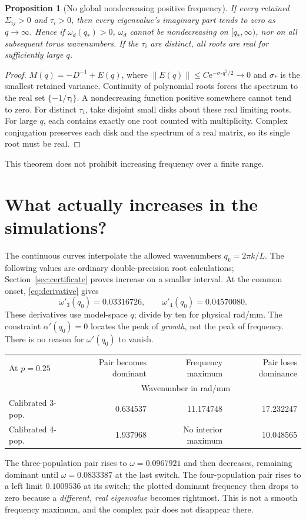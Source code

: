 \documentclass[11pt]{article}
\newtheorem{proposition}{Proposition}
\newcommand{\ee}{\mathrm e}
\begin{document}
\begin{proposition}[No global nondecreasing positive frequency]
If every retained $\Sigma_{ij}>0$ and $\tau_i>0$, then every eigenvalue's
imaginary part tends to zero as $q\to\infty$. Hence if $\omega_d(q_*)>0$,
$\omega_d$ cannot be nondecreasing on $[q_*,\infty)$, nor on all subsequent
torus wavenumbers. If the $\tau_i$ are distinct, all roots are real for
sufficiently large $q$.
\end{proposition}
\begin{proof}
$M(q)=-D^{-1}+E(q)$, where $\|E(q)\|\le C\ee^{-\sigma_*q^2/2}\to0$ and
$\sigma_*$ is the smallest retained variance. Continuity of polynomial roots
forces the spectrum to the real set $\{-1/\tau_i\}$. A nondecreasing function
positive somewhere cannot tend to zero. For distinct $\tau_i$, take disjoint
small disks about these real limiting roots. For large $q$, each contains
exactly one root counted with multiplicity. Complex conjugation preserves each
disk and the spectrum of a real matrix, so its single root must be real.
\end{proof}
This theorem does not prohibit increasing frequency over a finite range.

\newpage
\section{What actually increases in the simulations?}
The continuous curves interpolate the allowed wavenumbers $q_k=2\pi k/L$.
The following values are ordinary double-precision root calculations;
Section~\ref{sec:certificate} proves increase on a smaller interval.
At the common onset, \eqref{eq:derivative} gives
\begin{equation}
 \omega'_3(q_0)=0.03316726,\qquad
 \omega'_4(q_0)=0.04570080.
 \label{eq:slopes}
\end{equation}
These derivatives use model-space $q$; divide by ten for physical rad/mm.
The constraint $\alpha'(q_0)=0$ locates the peak of \emph{growth}, not the
peak of frequency. There is no reason for $\omega'(q_0)$ to vanish.

\begin{center}\small
\begin{tabular}{lrrr}\toprule
At $p=0.25$ & Pair becomes dominant & Frequency maximum & Pair loses dominance\\
&\multicolumn{3}{c}{Wavenumber in rad/mm}\\\midrule
Calibrated 3-pop.&0.634537&11.174748&17.232247\\
Calibrated 4-pop.&1.937968&No interior maximum&10.048565\\
\bottomrule\end{tabular}
\end{center}
The three-population pair rises to $\omega=0.0967921$ and then decreases,
remaining dominant until $\omega=0.0833387$ at the last switch.
The four-population pair rises to a left limit $0.1009536$ at its switch;
the plotted dominant frequency then drops to zero because a \emph{different,
real eigenvalue} becomes rightmost. This is not a smooth frequency maximum,
and the complex pair does not disappear there.
\end{document}
